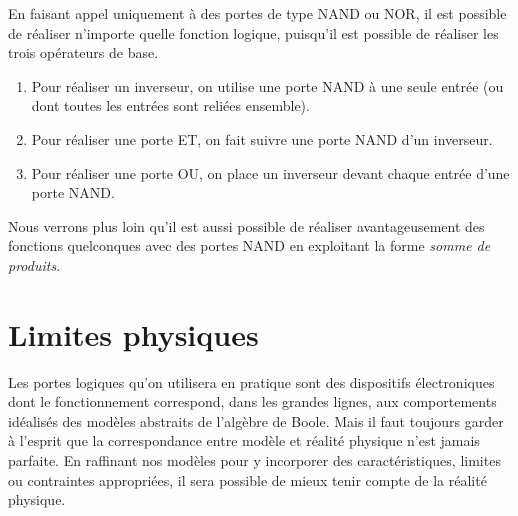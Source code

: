 \documentclass[letter, oneside]{book}
\begin{document}
En faisant appel uniquement à des portes de type NAND ou NOR, il est
possible de réaliser n'importe quelle fonction logique, puisqu'il est
possible de réaliser les trois opérateurs de base.

\begin{enumerate}
\item Pour réaliser un inverseur, on utilise une porte NAND à une seule
entrée (ou dont toutes les entrées sont reliées ensemble).
\item Pour réaliser une porte ET, on fait suivre une porte NAND d'un
inverseur.
\item Pour réaliser une porte OU, on place un inverseur devant chaque
entrée d'une porte NAND.
\end{enumerate}

Nous verrons plus loin qu'il est aussi possible de réaliser
avantageusement des fonctions quelconques avec des portes NAND en
exploitant la forme \emph{somme de produits}.

\section{Limites physiques}
\label{sec:org14a4d47}

Les portes logiques qu'on utilisera en pratique sont des dispositifs
électroniques dont le fonctionnement correspond, dans les grandes
lignes, aux comportements idéalisés des modèles abstraits de l'algèbre
de Boole. Mais il faut toujours garder à l'esprit que la
correspondance entre modèle et réalité physique n'est jamais
parfaite. En raffinant nos modèles pour y incorporer des
caractéristiques, limites ou contraintes appropriées, il sera possible
de mieux tenir compte de la réalité physique.
\end{document}
